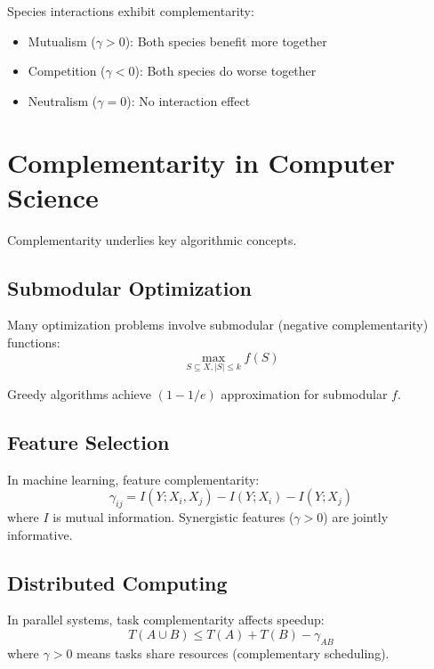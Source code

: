 Species interactions exhibit complementarity:
\begin{itemize}
    \item Mutualism ($\gamma > 0$): Both species benefit more together
    \item Competition ($\gamma < 0$): Both species do worse together
    \item Neutralism ($\gamma = 0$): No interaction effect
\end{itemize}

\section{Complementarity in Computer Science}
\label{sec:cs}

Complementarity underlies key algorithmic concepts.

\subsection{Submodular Optimization}

Many optimization problems involve submodular (negative complementarity) functions:
\begin{equation}
\max_{S \subseteq X, |S| \leq k} f(S)
\end{equation}

Greedy algorithms achieve $(1 - 1/e)$ approximation for submodular $f$.

\subsection{Feature Selection}

In machine learning, feature complementarity:
\begin{equation}
\gamma_{ij} = I(Y; X_i, X_j) - I(Y; X_i) - I(Y; X_j)
\end{equation}
where $I$ is mutual information. Synergistic features ($\gamma > 0$) are jointly informative.

\subsection{Distributed Computing}

In parallel systems, task complementarity affects speedup:
\begin{equation}
T(A \cup B) \leq T(A) + T(B) - \gamma_{AB}
\end{equation}
where $\gamma > 0$ means tasks share resources (complementary scheduling).

